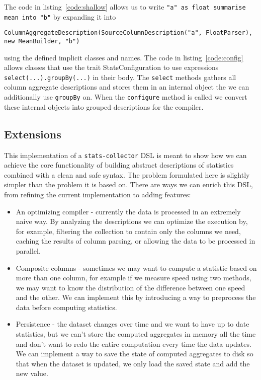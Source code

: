 The code in listing~\ref{code:shallow} allows us to write \texttt{"a" as float summarise mean into "b"} by expanding it into 
\begin{verbatim}
ColumnAggregateDescription(SourceColumnDescription("a", FloatParser), new MeanBuilder, "b")
\end{verbatim}
using the defined implicit classes and names. The code in listing~\ref{code:config} allows classes that use the trait StatsConfiguration to use expressions \texttt{select(...).groupBy(...)} in their body. The \texttt{select} methods gathers all column aggregate descriptions and stores them in an internal object the we can additionally use \texttt{groupBy} on. When the \texttt{configure} method is called we convert these internal objects into grouped descriptions for the compiler.

\subsection{Extensions}

This implementation of a \texttt{stats-collector} DSL is meant to show how we can achieve the core functionality of building abstract descriptions of statistics combined with a clean and safe syntax. The problem formulated here is slightly simpler than the problem it is based on. There are ways we can enrich this DSL, from refining the current implementation to adding features:
\begin{itemize}
	\item An optimizing compiler - currently the data is processed in an extremely naive way. By analyzing the descriptions we can optimize the execution by, for example, filtering the collection to contain only the columns we need, caching the results of column parsing, or allowing the data to be processed in parallel.
  \item Composite columns - sometimes we may want to compute a statistic based on more than one column, for example if we measure speed using two methods, we may want to know the distribution of the difference between one speed and the other. We can implement this by introducing a way to preprocess the data before computing statistics.
  \item Persistence - the dataset changes over time and we want to have up to date statistics, but we can't store the computed aggregates in memory all the time and don't want to redo the entire computation every time the data updates. We can implement a way to save the state of computed aggregates to disk so that when the dataset is updated, we only load the saved state and add the new value.
\end{itemize}


